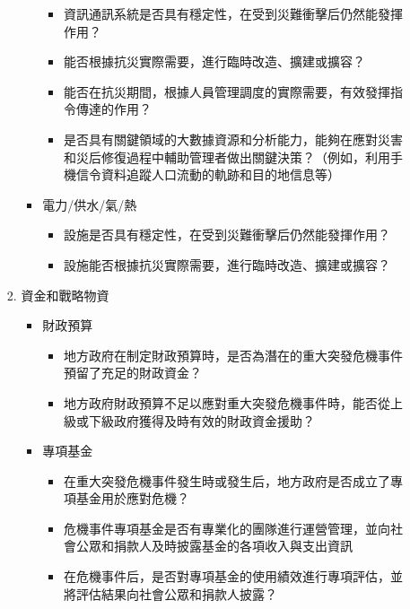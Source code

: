 \documentclass[a4paper,12pt]{article}
\begin{document}
\begin{enumerate}
\begin{enumerate}
\begin{enumerate}
\begin{itemize}
\label{sec:orgc9d0f69}
\begin{itemize}
\item 資訊通訊系統是否具有穩定性，在受到災難衝擊后仍然能發揮作用？\\
\item 能否根據抗災實際需要，進行臨時改造、擴建或擴容？\\
\item 能否在抗災期間，根據人員管理調度的實際需要，有效發揮指令傳達的作用？\\
\item 是否具有關鍵領域的大數據資源和分析能力，能夠在應對災害和災后修復過程中輔助管理者做出關鍵決策？（例如，利用手機信令資料追蹤人口流動的軌跡和目的地信息等）\\
\end{itemize}
\item 電力/供水/氣/熱
\label{sec:orge2276ad}
\begin{itemize}
\item 設施是否具有穩定性，在受到災難衝擊后仍然能發揮作用？\\
\item 設施能否根據抗災實際需要，進行臨時改造、擴建或擴容？\\
\end{itemize}
\end{itemize}
\item 資金和戰略物資
\label{sec:orgf0987ff}
\begin{itemize}
\item 財政預算
\label{sec:org763f77f}
\begin{itemize}
\item 地方政府在制定財政預算時，是否為潛在的重大突發危機事件預留了充足的財政資金？\\
\item 地方政府財政預算不足以應對重大突發危機事件時，能否從上級或下級政府獲得及時有效的財政資金援助？\\
\end{itemize}
\item 專項基金
\label{sec:org57f3eec}
\begin{itemize}
\item 在重大突發危機事件發生時或發生后，地方政府是否成立了專項基金用於應對危機？\\
\item 危機事件專項基金是否有專業化的團隊進行運營管理，並向社會公眾和捐款人及時披露基金的各項收入與支出資訊\\
\item 在危機事件后，是否對專項基金的使用績效進行專項評估，並將評估結果向社會公眾和捐款人披露？\\

\end{itemize}
\end{itemize}
\end{enumerate}
\end{enumerate}
\end{enumerate}
\end{document}
